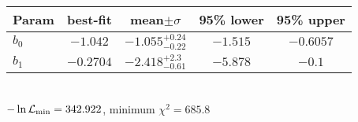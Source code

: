 \begin{tabular}{|l|c|c|c|c|} 
 \hline 
Param & best-fit & mean$\pm\sigma$ & 95\% lower & 95\% upper \\ \hline 
$b_{0 }$ &$-1.042$ & $-1.055_{-0.22}^{+0.24}$ & $-1.515$ & $-0.6057$ \\ 
$b_{1 }$ &$-0.2704$ & $-2.418_{-0.61}^{+2.3}$ & $-5.878$ & $-0.1$ \\ 
\hline 
 \end{tabular} \\ 
$-\ln{\cal L}_\mathrm{min} =342.922$, minimum $\chi^2=685.8$ \\ 
